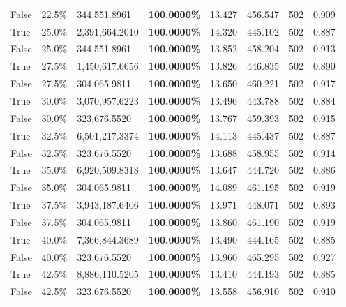 \begin{table}[H]
{\begin{tabular}{lllrllll}
\cline{1-8}
False & 22.5\% & 344,551.8961 & \bfseries \color{red} 100.0000\% & 13.427 & 456.547 & 502 & 0.909 \\
\cline{1-8}
True & 25.0\% & 2,391,664.2010 & \bfseries \color{red} 100.0000\% & 14.320 & 445.102 & 502 & 0.887 \\
\cline{1-8}
False & 25.0\% & 344,551.8961 & \bfseries \color{red} 100.0000\% & 13.852 & 458.204 & 502 & 0.913 \\
\cline{1-8}
True & 27.5\% & 1,450,617.6656 & \bfseries \color{red} 100.0000\% & 13.826 & 446.835 & 502 & 0.890 \\
\cline{1-8}
False & 27.5\% & 304,065.9811 & \bfseries \color{red} 100.0000\% & 13.650 & 460.221 & 502 & 0.917 \\
\cline{1-8}
True & 30.0\% & 3,070,957.6223 & \bfseries \color{red} 100.0000\% & 13.496 & 443.788 & 502 & 0.884 \\
\cline{1-8}
False & 30.0\% & 323,676.5520 & \bfseries \color{red} 100.0000\% & 13.767 & 459.393 & 502 & 0.915 \\
\cline{1-8}
True & 32.5\% & 6,501,217.3374 & \bfseries \color{red} 100.0000\% & 14.113 & 445.437 & 502 & 0.887 \\
\cline{1-8}
False & 32.5\% & 323,676.5520 & \bfseries \color{red} 100.0000\% & 13.688 & 458.955 & 502 & 0.914 \\
\cline{1-8}
True & 35.0\% & 6,920,509.8318 & \bfseries \color{red} 100.0000\% & 13.647 & 444.720 & 502 & 0.886 \\
\cline{1-8}
False & 35.0\% & 304,065.9811 & \bfseries \color{red} 100.0000\% & 14.089 & 461.195 & 502 & 0.919 \\
\cline{1-8}
True & 37.5\% & 3,943,187.6406 & \bfseries \color{red} 100.0000\% & 13.971 & 448.071 & 502 & 0.893 \\
\cline{1-8}
False & 37.5\% & 304,065.9811 & \bfseries \color{red} 100.0000\% & 13.860 & 461.190 & 502 & 0.919 \\
\cline{1-8}
True & 40.0\% & 7,366,844.3689 & \bfseries \color{red} 100.0000\% & 13.490 & 444.165 & 502 & 0.885 \\
\cline{1-8}
False & 40.0\% & 323,676.5520 & \bfseries \color{red} 100.0000\% & 13.960 & 465.295 & 502 & 0.927 \\
\cline{1-8}
True & 42.5\% & 8,886,110.5205 & \bfseries \color{red} 100.0000\% & 13.410 & 444.193 & 502 & 0.885 \\
\cline{1-8}
False & 42.5\% & 323,676.5520 & \bfseries \color{red} 100.0000\% & 13.558 & 456.910 & 502 & 0.910 \\

\end{tabular}}
\end{table}
